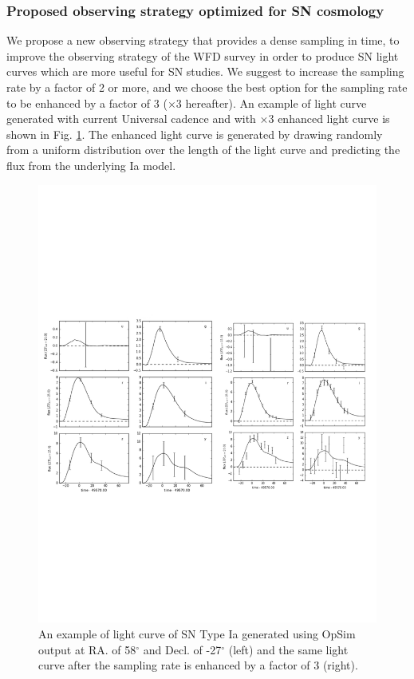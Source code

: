 \subsubsection{Proposed observing strategy optimized for SN cosmology}

We propose a new observing strategy that provides a dense sampling in time, to improve the
observing strategy of the WFD survey in order to produce SN light curves which are
more useful for SN studies.
We suggest to increase the sampling rate by a factor of 2 or more, and we choose the best option for the sampling rate
to be enhanced by a factor of 3 ($\times$3 hereafter).
An example of light curve generated with current Universal cadence
and with $\times$3
enhanced light curve is shown in Fig. \ref{fig:LCrandom}.
The enhanced light curve is generated by drawing randomly from a uniform distribution over the
length of the light curve and predicting the flux from the underlying Ia model.

\begin{figure}
\centering
\includegraphics[width=13truecm]{figs/supernova/LCrandomseed.pdf}
\caption{An example of light curve of SN Type Ia generated using OpSim output
at RA. of 58$^{\circ}$ and Decl. of -27$^{\circ}$ (left) and the same light curve
after the sampling rate is enhanced by a factor of 3 (right).}
  \label{fig:LCrandom}
\end{figure}

